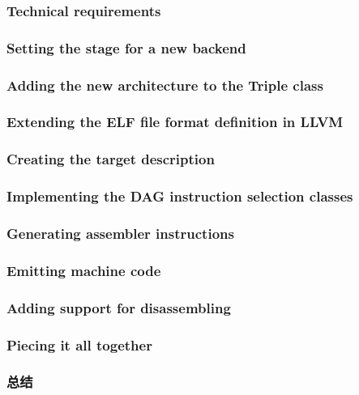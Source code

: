\documentclass[11pt,a4paper,UTF8]{ctexart}
\begin{document}
		\subsubsection{Technical requirements}
		\subsubsection{Setting the stage for a new backend}
		\subsubsection{Adding the new architecture to the Triple class}
		\subsubsection{Extending the ELF file format definition in LLVM}
		\subsubsection{Creating the target description}
		\subsubsection{Implementing the DAG instruction selection classes}
		\subsubsection{Generating assembler instructions}
		\subsubsection{Emitting machine code}
		\subsubsection{Adding support for disassembling}
		\subsubsection{Piecing it all together}
		\subsubsection{总结}
\end{document}
